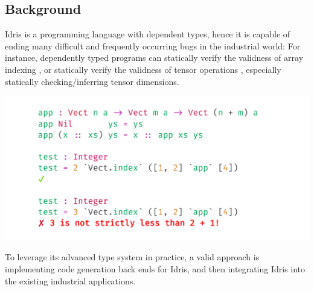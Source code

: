 \documentclass[a1,portrait]{a1poster}
\begin{document}
\begin{multicols}{2}


\section*{Background}

Idris is a programming language with dependent types,
hence it is capable of ending many difficult and frequently occurring bugs in the industrial world:
For instance, dependently typed programs can statically verify the validness of array indexing \cite {xi1998eliminating},
or statically verify the validness of tensor operations \cite {eaton2006statically} \cite {chen2017typesafe},
especially statically checking/inferring tensor dimensions.

\begin{minipage}[b]{1\linewidth}
\begin{center}
\includegraphics[width=0.8\linewidth]{figs/canonical.png}
\vspace{-1cm}
\end{center}

\end{minipage}

\vspace{0.5cm}

To leverage its advanced type system in practice, a valid approach is
implementing code generation back ends for Idris, and then integrating Idris into
the existing industrial applications.


\end{multicols}
\end{document}

